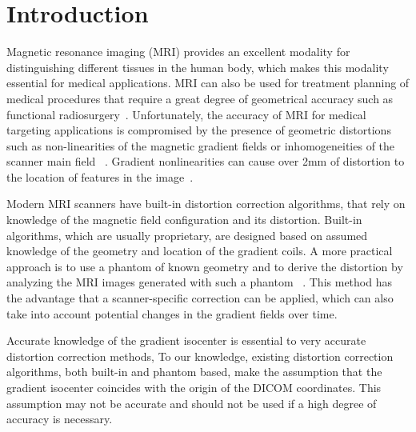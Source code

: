 \section{Introduction}
\label{Introduction}

Magnetic resonance imaging (MRI) provides an excellent modality for distinguishing different tissues in the human body, which makes this modality essential for medical applications. MRI can also be used for treatment planning of medical procedures that require a great degree of geometrical accuracy such as  functional radiosurgery~\cite{Kond99}. Unfortunately, the accuracy of MRI for medical targeting applications is compromised by the presence of geometric distortions such as non-linearities of the magnetic gradient fields or inhomogeneities of the scanner main field ~\cite{Dor05,LSS06a,LSS06b,LSS08a,LSS08b,Lang99,Wang04a,Wang04b}. Gradient nonlinearities can cause over 2mm of distortion to the location of features in the image~\cite{LSS08b,Lang99}.

Modern MRI scanners have built-in distortion correction algorithms, that rely on knowledge of the magnetic field configuration and its distortion. Built-in algorithms, which are usually proprietary, are designed based on assumed knowledge of the geometry and location of the gradient coils. A more practical approach is to use a phantom of known geometry and to derive the distortion by analyzing the MRI images generated with such a phantom ~\cite{Dor05,LSS06a,LSS06b,LSS08a,LSS08b,Lang99,Wang04a,Wang04b}. This method has the advantage that a scanner-specific correction can be applied, which can also take into account potential changes in the gradient fields over time.

Accurate knowledge of the gradient isocenter is essential to very accurate distortion correction methods, To our knowledge, existing distortion correction algorithms, both built-in and phantom based, make the assumption that the gradient isocenter coincides with the origin of the DICOM coordinates. This assumption may not be accurate and should not be used if a high degree of accuracy is necessary.

